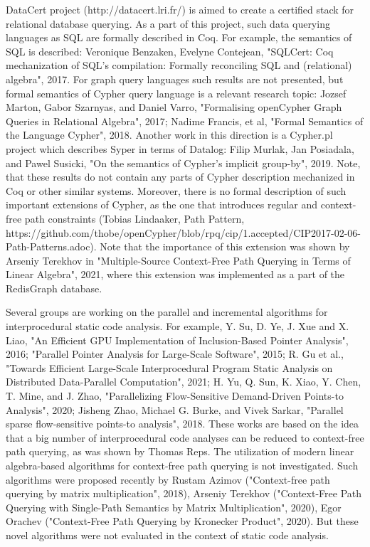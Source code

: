 \documentclass[12pt]{article}  %
\theoremstyle{remark}
\begin{document}
DataCert project (http://datacert.lri.fr/) is aimed to create a certified stack for relational database querying. As a part of this project, such data querying languages as SQL are formally described in Coq. For example, the semantics of SQL is described: Veronique Benzaken, Evelyne Contejean, "SQLCert: Coq mechanization of SQL’s compilation: Formally reconciling SQL and (relational) algebra", 2017. For graph query languages such results are not presented, but formal semantics of Cypher query language is a relevant research topic: Jozsef Marton, Gabor Szarnyas, and Daniel Varro, "Formalising openCypher Graph Queries in Relational Algebra", 2017; Nadime Francis, et al, "Formal Semantics of the Language Cypher", 2018.  Another work in this direction is a Cypher.pl project which describes Syper in terms of Datalog: Filip Murlak, Jan Posiadala, and Pawel Susicki, "On the semantics of Cypher’s implicit group-by", 2019. Note, that these results do not contain any parts of Cypher description mechanized in Coq or other similar systems. Moreover, there is no formal description of such important extensions of Cypher, as the one that introduces regular and context-free path constraints (Tobias Lindaaker, Path Pattern, https://github.com/thobe/openCypher/blob/rpq/cip/1.accepted/CIP2017-02-06-Path-Patterns.adoc). Note that the importance of this extension was shown by Arseniy Terekhov in "Multiple-Source Context-Free Path Querying in Terms of Linear Algebra", 2021, where this extension was implemented as a part of the RedisGraph database.

Several groups are working on the parallel and incremental algorithms for interprocedural static code analysis. For example, Y. Su, D. Ye, J. Xue and X. Liao, "An Efficient GPU Implementation of Inclusion-Based Pointer Analysis", 2016; "Parallel Pointer Analysis for Large-Scale Software", 2015; R. Gu et al., "Towards Efficient Large-Scale Interprocedural Program Static Analysis on Distributed Data-Parallel Computation", 2021; H. Yu, Q. Sun, K. Xiao, Y. Chen, T. Mine, and J. Zhao, "Parallelizing Flow-Sensitive Demand-Driven Points-to Analysis", 2020; Jisheng Zhao, Michael G. Burke, and Vivek Sarkar, "Parallel sparse flow-sensitive points-to analysis", 2018. These works are based on the idea that a big number of interprocedural code analyses can be reduced to context-free path querying, as was shown by Thomas Reps. The utilization of modern linear algebra-based algorithms for context-free path querying is not investigated. Such algorithms were proposed recently by Rustam Azimov ("Context-free path querying by matrix multiplication", 2018), Arseniy Terekhov ("Context-Free Path Querying with Single-Path Semantics by Matrix Multiplication", 2020), Egor Orachev ("Context-Free Path Querying by Kronecker Product", 2020). But these novel algorithms were not evaluated in the context of static code analysis. 
\end{document}
